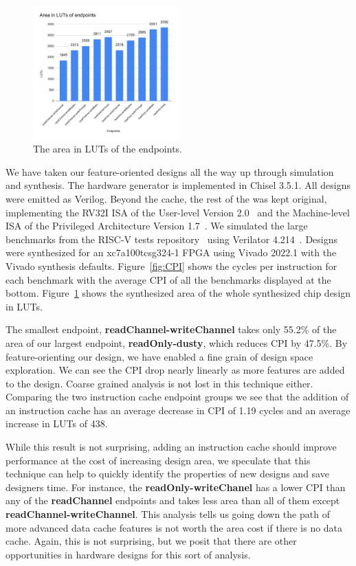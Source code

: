 \documentclass[conference]{IEEEtran}
\begin{document}
\begin{figure}[ht]
    \centering
    \includegraphics[width=0.5\textwidth]{isca2023-latex-template/figures/Area in LUTs of endpoints.pdf}
    \caption{The area in LUTs of the endpoints.}
    \label{fig:area}
\end{figure}

We have taken our feature-oriented designs all the way up through simulation and synthesis. The hardware generator is implemented in Chisel 3.5.1. All designs were emitted as Verilog. Beyond the cache, the rest of the \Riscvmini{} was kept original, implementing the RV32I ISA of the User-level Version 2.0~\cite{riscv:user} and the Machine-level ISA of the Privileged Architecture Version 1.7~\cite{riscv:priv}. We simulated the large benchmarks from the RISC-V tests repository~\cite{RvTest} using Verilator 4.214~\cite{verilator}. Designs were synthesized for an xc7a100tcsg324-1 FPGA using Vivado 2022.1 with the Vivado synthesis defaults. Figure~\ref{fig:CPI} shows the cycles per instruction for each benchmark with the average CPI of all the benchmarks displayed at the bottom. Figure~\ref{fig:area} shows the synthesized area of the whole synthesized chip design in LUTs. 

The smallest endpoint, \textbf{readChannel-writeChannel} takes only 55.2\% of the area of our largest endpoint, \textbf{readOnly-dusty}, which reduces CPI by 47.5\%. By feature-orienting our design, we have enabled a fine grain of design space exploration. We can see the CPI drop nearly linearly as more features are added to the design. Coarse grained analysis is not lost in this technique either. Comparing the two instruction cache endpoint groups we see that the addition of an instruction cache has an average decrease in CPI of 1.19 cycles and an average increase in LUTs of 438. 

While this result is not surprising, adding an instruction cache should improve performance at the cost of increasing design area, we speculate that this technique can help to quickly identify the properties of new designs and save designers time. For instance, the \textbf{readOnly-writeChanel} has a lower CPI than any of the \textbf{readChannel} endpoints and takes less area than all of them except \textbf{readChannel-writeChannel}. This analysis tells us going down the path of more advanced data cache features is not worth the area cost if there is no data cache. Again, this is not surprising, but we posit that there are other opportunities in hardware designs for this sort of analysis.
\end{document}

